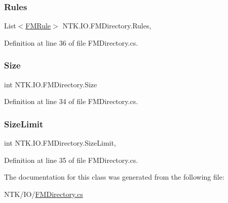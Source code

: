 \subsubsection{\texorpdfstring{Rules}{Rules}}
{\footnotesize\ttfamily List$<$\mbox{\hyperlink{class_n_t_k_1_1_i_o_1_1_f_m_rule}{F\+M\+Rule}}$>$ N\+T\+K.\+I\+O.\+F\+M\+Directory.\+Rules\hspace{0.3cm}{\ttfamily [get]}, {\ttfamily [set]}}



Definition at line 36 of file F\+M\+Directory.\+cs.

\mbox{\label{class_n_t_k_1_1_i_o_1_1_f_m_directory_a9c97224fd4d643df3be017bacd655bc0}} 
\subsubsection{\texorpdfstring{Size}{Size}}
{\footnotesize\ttfamily int N\+T\+K.\+I\+O.\+F\+M\+Directory.\+Size\hspace{0.3cm}{\ttfamily [get]}}



Definition at line 34 of file F\+M\+Directory.\+cs.

\mbox{\label{class_n_t_k_1_1_i_o_1_1_f_m_directory_abcb565f98a1b1028ef742623036db062}} 
\subsubsection{\texorpdfstring{SizeLimit}{SizeLimit}}
{\footnotesize\ttfamily int N\+T\+K.\+I\+O.\+F\+M\+Directory.\+Size\+Limit\hspace{0.3cm}{\ttfamily [get]}, {\ttfamily [set]}}



Definition at line 35 of file F\+M\+Directory.\+cs.



The documentation for this class was generated from the following file\+:\begin{DoxyCompactItemize}
\item 
N\+T\+K/\+I\+O/\mbox{\hyperlink{_f_m_directory_8cs}{F\+M\+Directory.\+cs}}\end{DoxyCompactItemize}
